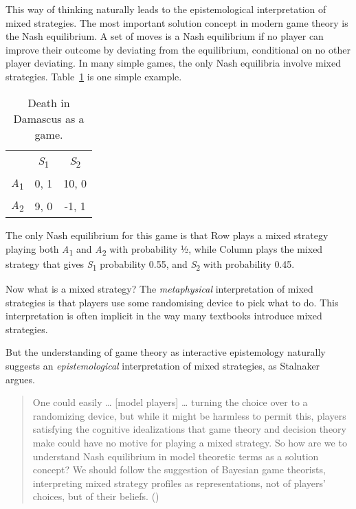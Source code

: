 \documentclass[
  10pt,
  letterpaper,
  twoside]{scrbook}
\begin{document}
This way of thinking naturally leads to the epistemological
interpretation of mixed strategies. The most important solution concept
in modern game theory is the Nash equilibrium. A set of moves is a Nash
equilibrium if no player can improve their outcome by deviating from the
equilibrium, conditional on no other player deviating. In many simple
games, the only Nash equilibria involve mixed strategies.
Table~\ref{tbl-death-damascus} is one simple example.

\begin{longtable}[]{@{}lcc@{}}
\caption{Death in Damascus as a
game.}\label{tbl-death-damascus}\tabularnewline
\toprule\noalign{}
\endfirsthead
\endhead
\bottomrule\noalign{}
\endlastfoot
& \emph{S}\textsubscript{1} & \emph{S}\textsubscript{2} \\
\emph{A}\textsubscript{1} & 0, 1 & 10, 0 \\
\emph{A}\textsubscript{2} & 9, 0 & -1, 1 \\
\end{longtable}

The only Nash equilibrium for this game is that Row plays a mixed
strategy playing both \emph{A}\textsubscript{1} and
\emph{A}\textsubscript{2} with probability ½, while Column plays the
mixed strategy that gives \emph{S}\textsubscript{1} probability 0.55,
and \emph{S}\textsubscript{2} with probability 0.45.

Now what is a mixed strategy? The \emph{metaphysical} interpretation of
mixed strategies is that players use some randomising device to pick
what to do. This interpretation is often implicit in the way many
textbooks introduce mixed strategies.

But the understanding of game theory as interactive epistemology
naturally suggests an \emph{epistemological} interpretation of mixed
strategies, as Stalnaker argues.

\begin{quote}
One could easily \ldots{} {[}model players{]} \ldots{} turning the
choice over to a randomizing device, but while it might be harmless to
permit this, players satisfying the cognitive idealizations that game
theory and decision theory make could have no motive for playing a mixed
strategy. So how are we to understand Nash equilibrium in model
theoretic terms as a solution concept? We should follow the suggestion
of Bayesian game theorists, interpreting mixed strategy profiles as
representations, not of players' choices, but of their beliefs.
()
\end{quote}
\end{document}
